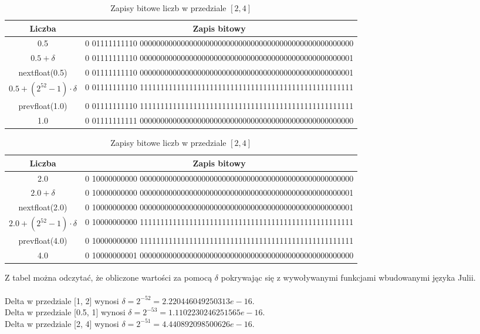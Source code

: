 \documentclass{article}
\begin{document}
\begin{table}[H]
    \centering
    \begin{tabular}{|c|c|}
        \hline
        \textbf{Liczba} & \textbf{Zapis bitowy} \\
        \hline
        0.5 & 0 01111111110 0000000000000000000000000000000000000000000000000000 \\
        \hline
        $0.5 + \delta$ & 0 01111111110 0000000000000000000000000000000000000000000000000001 \\
        \hline
        nextfloat(0.5) & 0 01111111110 0000000000000000000000000000000000000000000000000001 \\
        \hline
        $0.5 + (2^{52} - 1)\cdot \delta$ & 0 01111111110 1111111111111111111111111111111111111111111111111111 \\
        \hline
        prevfloat(1.0) & 0 01111111110 1111111111111111111111111111111111111111111111111111 \\
        \hline
        1.0 & 0 01111111111 0000000000000000000000000000000000000000000000000000 \\
        \hline
    \end{tabular}
    \caption{Zapisy bitowe liczb w przedziale $[0.5, 1]$}
    \centering
    \begin{tabular}{|c|c|}
        \hline
        \textbf{Liczba} & \textbf{Zapis bitowy} \\
        \hline
        2.0 & 0 10000000000 0000000000000000000000000000000000000000000000000000 \\
        \hline
        $2.0 + \delta$ & 0 10000000000 0000000000000000000000000000000000000000000000000001 \\
        \hline
        nextfloat(2.0) & 0 10000000000 0000000000000000000000000000000000000000000000000001 \\
        \hline
        $2.0 + (2^{52} - 1)\cdot \delta$ & 0 10000000000 1111111111111111111111111111111111111111111111111111 \\
        \hline
        prevfloat(4.0) & 0 10000000000 1111111111111111111111111111111111111111111111111111 \\
        \hline
        4.0 & 0 10000000001 0000000000000000000000000000000000000000000000000000 \\
        \hline
    \end{tabular}
    \caption{Zapisy bitowe liczb w przedziale $[2, 4]$}
\end{table}

Z tabel można odczytać, że obliczone wartości za pomocą $\delta$ pokrywając się z wywoływanymi funkcjami wbudowanymi języka Julii. 
\\
\\Delta w przedziale [1, 2] wynosi $\delta = 2^{-52} = 2.220446049250313e-16$.
\\
Delta w przedziale [0.5, 1] wynosi $\delta = 2^{-53} = 1.1102230246251565e-16$.
\\
Delta w przedziale [2, 4] wynosi $\delta = 2^{-51} =  4.440892098500626e-16$.
\\
\end{document}
